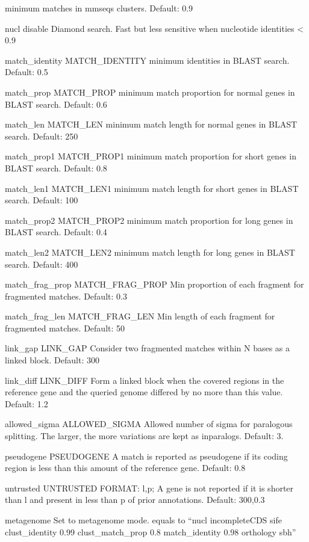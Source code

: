 \documentclass[letterpaper,10pt,english]{sphinxmanual}
\begin{document}
\begin{description}
\begin{optionlist}{3cm}
minimum matches in mmseqs clusters. Default: 0.9
\item [\sphinxhyphen{}\sphinxhyphen{}nucl]  
disable Diamond search. Fast but less sensitive when nucleotide identities \textless{} 0.9
\item [\sphinxhyphen{}\sphinxhyphen{}match\_identity MATCH\_IDENTITY]  
minimum identities in BLAST search. Default: 0.5
\item [\sphinxhyphen{}\sphinxhyphen{}match\_prop MATCH\_PROP]  
minimum match proportion for normal genes in BLAST search. Default: 0.6
\item [\sphinxhyphen{}\sphinxhyphen{}match\_len MATCH\_LEN]  
minimum match length for normal genes in BLAST search. Default: 250
\item [\sphinxhyphen{}\sphinxhyphen{}match\_prop1 MATCH\_PROP1]  
minimum match proportion for short genes in BLAST search. Default: 0.8
\item [\sphinxhyphen{}\sphinxhyphen{}match\_len1 MATCH\_LEN1]  
minimum match length for short genes in BLAST search. Default: 100
\item [\sphinxhyphen{}\sphinxhyphen{}match\_prop2 MATCH\_PROP2]  
minimum match proportion for long genes in BLAST search. Default: 0.4
\item [\sphinxhyphen{}\sphinxhyphen{}match\_len2 MATCH\_LEN2]  
minimum match length for long genes in BLAST search. Default: 400
\item [\sphinxhyphen{}\sphinxhyphen{}match\_frag\_prop MATCH\_FRAG\_PROP]  
Min proportion of each fragment for fragmented matches. Default: 0.3
\item [\sphinxhyphen{}\sphinxhyphen{}match\_frag\_len MATCH\_FRAG\_LEN]  
Min length of each fragment for fragmented matches. Default: 50
\item [\sphinxhyphen{}\sphinxhyphen{}link\_gap LINK\_GAP]  
Consider two fragmented matches within N bases as a linked block. Default: 300
\item [\sphinxhyphen{}\sphinxhyphen{}link\_diff LINK\_DIFF]  
Form a linked block when the covered regions in the reference gene
and the queried genome differed by no more than this value. Default: 1.2
\item [\sphinxhyphen{}\sphinxhyphen{}allowed\_sigma ALLOWED\_SIGMA]  
Allowed number of sigma for paralogous splitting.
The larger, the more variations are kept as inparalogs. Default: 3.
\item [\sphinxhyphen{}\sphinxhyphen{}pseudogene PSEUDOGENE]  
A match is reported as pseudogene if its coding region is less than this amount of the reference gene. Default: 0.8
\item [\sphinxhyphen{}\sphinxhyphen{}untrusted UNTRUSTED]  
FORMAT: l,p; A gene is not reported if it is shorter than l and present in less than p of prior annotations. Default: 300,0.3
\item [\sphinxhyphen{}\sphinxhyphen{}metagenome]  
Set to metagenome mode. equals to
“\textendash{}nucl \textendash{}incompleteCDS sife \textendash{}clust\_identity 0.99 \textendash{}clust\_match\_prop 0.8 \textendash{}match\_identity 0.98 \textendash{}orthology sbh”
\end{optionlist}


\end{description}
\end{document}
